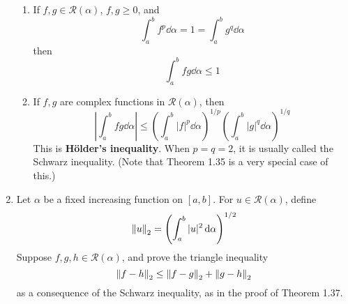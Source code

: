 \documentclass[../psets.tex]{subfiles}
\begin{document}
\begin{enumerate}[label={\textbf{\arabic*.}}]
\begin{enumerate}
        \item If $f,g\in\mathscr{R}(\alpha)$, $f,g\geq 0$, and
        \begin{equation*}
            \int_a^bf^p\dd{\alpha} = 1 = \int_a^bg^q\dd{\alpha}
        \end{equation*}
        then
        \begin{equation*}
            \int_a^b fg\dd{\alpha} \leq 1
        \end{equation*}
        \item If $f,g$ are complex functions in $\mathscr{R}(\alpha)$, then
        \begin{equation*}
            \left| \int_a^bfg\dd{\alpha} \right| \leq \left( \int_a^b|f|^p\dd{\alpha} \right)^{1/p}\left( \int_a^b|g|^q\dd{\alpha} \right)^{1/q}
        \end{equation*}
        This is \textbf{H\"{o}lder's inequality}. When $p=q=2$, it is usually called the Schwarz inequality. (Note that Theorem 1.35 is a very special case of this.)
    \end{enumerate}
    \item Let $\alpha$ be a fixed increasing function on $[a,b]$. For $u\in\mathscr{R}(\alpha)$, define
    \begin{equation*}
        \norm{u}_2 = \left( \int_a^b|u|^2\dd{\alpha} \right)^{1/2}
    \end{equation*}
    Suppose $f,g,h\in\mathscr{R}(\alpha)$, and prove the triangle inequality
    \begin{equation*}
        \norm{f-h}_2 \leq \norm{f-g}_2+\norm{g-h}_2
    \end{equation*}
    as a consequence of the Schwarz inequality, as in the proof of Theorem 1.37.
\end{enumerate}
\end{document}
